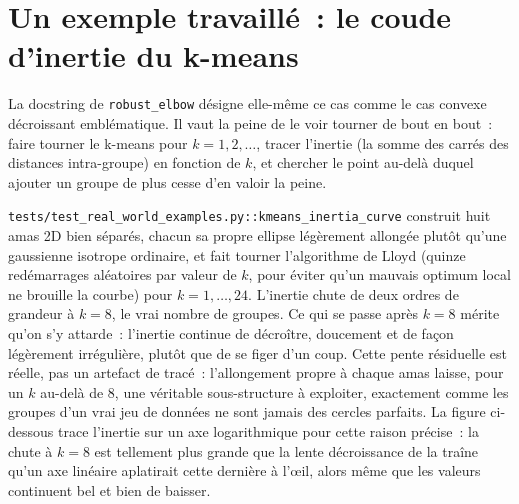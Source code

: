 \documentclass[11pt]{article}
\newcommand{\code}[1]{\texttt{#1}}
\begin{document}
\section{Un exemple travaillé~: le coude d'inertie du k-means}

La docstring de \code{robust\_elbow} désigne elle-même ce cas comme le cas
convexe décroissant emblématique. Il vaut la peine de le voir tourner de
bout en bout~: faire tourner le k-means pour $k = 1, 2, \dots$, tracer
l'inertie (la somme des carrés des distances intra-groupe) en fonction de
$k$, et chercher le point au-delà duquel ajouter un groupe de plus cesse
d'en valoir la peine.

\code{tests/test\_real\_world\_examples.py::kmeans\_inertia\_curve}
construit huit amas 2D bien séparés, chacun sa propre ellipse légèrement
allongée plutôt qu'une gaussienne isotrope ordinaire, et fait tourner
l'algorithme de Lloyd (quinze redémarrages aléatoires par valeur de $k$,
pour éviter qu'un mauvais optimum local ne brouille la courbe) pour $k = 1,
\dots, 24$. L'inertie chute de deux ordres de grandeur à $k = 8$, le vrai
nombre de groupes. Ce qui se passe après $k = 8$ mérite qu'on s'y attarde~:
l'inertie continue de décroître, doucement et de façon légèrement
irrégulière, plutôt que de se figer d'un coup. Cette pente résiduelle est
réelle, pas un artefact de tracé~: l'allongement propre à chaque amas
laisse, pour un $k$ au-delà de 8, une véritable sous-structure à exploiter,
exactement comme les groupes d'un vrai jeu de données ne sont jamais des
cercles parfaits. La figure ci-dessous trace l'inertie sur un axe
logarithmique pour cette raison précise~: la chute à $k=8$ est tellement
plus grande que la lente décroissance de la traîne qu'un axe linéaire
aplatirait cette dernière à l'œil, alors même que les valeurs continuent
bel et bien de baisser.
\end{document}
